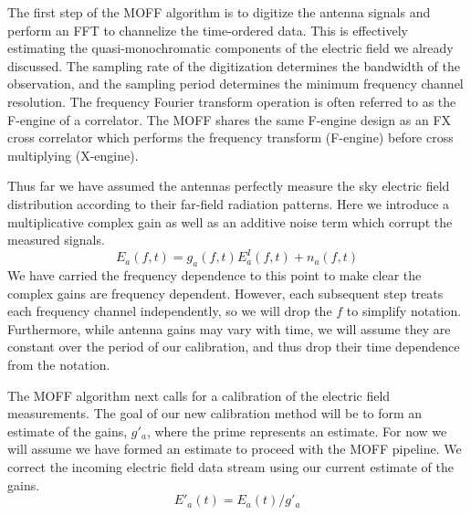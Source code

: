 \documentclass[a4paper,fleqn,usenatbib]{mnras}
\newcommand{\Er}[1]{\ensuremath{\widetilde{E}_{#1}}}
\begin{document}
The first step of the MOFF algorithm is to digitize the antenna signals and perform an FFT to 
channelize the time-ordered data. This is effectively estimating the quasi-monochromatic 
components of the electric field we already discussed. The sampling rate of the digitization 
determines the bandwidth of the observation, and the sampling period determines the minimum 
frequency channel resolution. The frequency Fourier transform operation is often referred to as 
the F-engine of a correlator. The MOFF shares the same F-engine design as an FX cross
correlator which performs the frequency transform (F-engine) before cross multiplying 
(X-engine). 


Thus far we have assumed the antennas perfectly measure the sky electric field distribution according to their far-field radiation patterns. Here we introduce a multiplicative complex gain as well as an additive noise term which corrupt the measured signals.
\begin{equation}\label{eq:apply_gain}
E_a(f,t) = g_a(f,t) E_a^I(f,t) + n_a(f,t)
\end{equation}
We have carried the frequency dependence to this point to make clear the complex gains are
frequency dependent. However, each subsequent step treats each frequency 
channel independently, so we will drop the $f$ to simplify notation. 
Furthermore, while antenna gains may vary with time, we will assume they are constant over
the period of our calibration, and thus drop their time dependence from the notation.

The MOFF algorithm next calls for a calibration of the electric field measurements. The goal of our new calibration method will be 
to form an estimate of the gains, $g'_a$, where the prime represents an estimate. For now we will assume we have formed an estimate 
to proceed with the MOFF pipeline. We correct the incoming electric field data stream using our 
current estimate of the gains.
\begin{equation}
E'_a(t) = E_a(t)/ g'_a
\end{equation}
\end{document}
